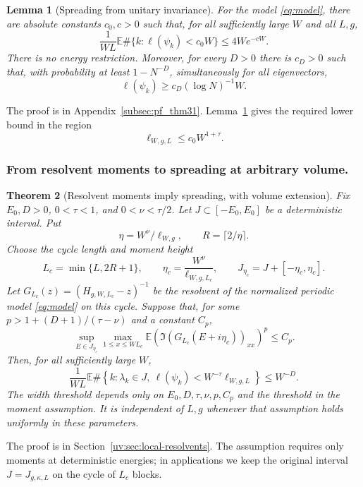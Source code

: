 \documentclass[11pt]{article}
\numberwithin{equation}{section}
\newtheorem{theorem}{Theorem}[section]
\newtheorem{lemma}[theorem]{Lemma}
\theoremstyle{remark}
\newcommand{\E}{\mathbb E}
\newcommand{\ellscale}{\ell_{W,g}}
\newcommand{\ellstar}{\ell_{W,g,L}}
\begin{document}
\begin{lemma}[Spreading from unitary invariance]
\label{thm:orbital}
For the model \eqref{eq:model}, there are absolute constants $c_0,c>0$
such that, for all sufficiently large $W$ and all $L,g$,
\begin{equation}\label{eq:haar-count}
 \frac1{WL}\E\#\{k:\ell(\psi_k)<c_0W\}\le4We^{-cW}.
\end{equation}
There is no energy restriction. Moreover, for every $D>0$ there is
$c_D>0$ such that, with probability at least $1-N^{-D}$,
simultaneously for all eigenvectors,
\begin{equation}\label{eq:orbital-length}
 \ell(\psi_k)\ge c_D(\log N)^{-1}W.
\end{equation}
\end{lemma}
The proof is in Appendix~\ref{subsec:pf_thm31}.
Lemma~\ref{thm:orbital} gives the required lower bound in the region
\begin{equation}\label{uv:eq:haar-lower-region}
 \ellstar\le c_0W^{1+\tau}.
\end{equation}

\subsubsection*{From resolvent moments to spreading at arbitrary volume.}
\begin{theorem}[Resolvent moments imply spreading, with volume extension]
\label{uv:lem:lower-volume}
Fix $E_0,D>0$, $0<\tau<1$, and $0<\nu<\tau/2$.
Let $J\subset[-E_0,E_0]$ be a deterministic interval. Put
\begin{equation}\label{uv:eq:lower-volume-scales}
 \eta=W^\nu/\ellscale,\qquad R=\lceil2/\eta\rceil.
\end{equation}
Choose the cycle length and moment height
\[
 L_c=\min\{L,2R+1\},\qquad
 \eta_c=\frac{W^\nu}{\ell_{W,g,L_c}},\qquad
 J_{\eta_c}=J+[-\eta_c,\eta_c].
\]
Let $G_{L_c}(z)=(H_{g,W,L_c}-z)^{-1}$ be the resolvent of the normalized
periodic model \eqref{eq:model} on this cycle.
Suppose that, for some $p>1+(D+1)/(\tau-\nu)$ and a constant $C_p$,
\begin{equation}\label{uv:eq:lower-volume-moment}
 \sup_{E\in J_{\eta_c}}\max_{1\le x\le WL_c}
 \E\left(\Im(G_{L_c}(E+i\eta_c))_{xx}\right)^p\le C_p.
\end{equation}
Then, for all sufficiently large $W$,
\begin{equation}\label{uv:eq:lower-volume-output}
 \frac1{WL}\E\#\left\{k:\lambda_k\in J,\
       \ell(\psi_k)<W^{-\tau}\ellstar\right\}\le W^{-D}.
\end{equation}
The width threshold depends only on $E_0,D,\tau,\nu,p,C_p$ and the
threshold in the moment assumption. It is independent of $L,g$
whenever that assumption holds uniformly in these parameters.
\end{theorem}
The proof is in Section~\ref{uv:sec:local-resolvents}.
The assumption requires only moments at deterministic energies;
in applications we keep the original interval $J=J_{g,\kappa,L}$
on the cycle of $L_c$ blocks.
\end{document}
